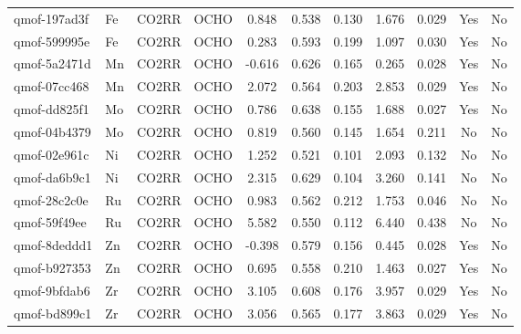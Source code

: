 {\begin{longtable}{llllccccccc}
qmof-197ad3f & Fe & CO2RR & OCHO & 0.848 & 0.538 & 0.130 & 1.676 & 0.029 & Yes & No \\
qmof-599995e & Fe & CO2RR & OCHO & 0.283 & 0.593 & 0.199 & 1.097 & 0.030 & Yes & No \\
qmof-5a2471d & Mn & CO2RR & OCHO & -0.616 & 0.626 & 0.165 & 0.265 & 0.028 & Yes & No \\
qmof-07cc468 & Mn & CO2RR & OCHO & 2.072 & 0.564 & 0.203 & 2.853 & 0.029 & Yes & No \\
qmof-dd825f1 & Mo & CO2RR & OCHO & 0.786 & 0.638 & 0.155 & 1.688 & 0.027 & Yes & No \\
qmof-04b4379 & Mo & CO2RR & OCHO & 0.819 & 0.560 & 0.145 & 1.654 & 0.211 & No & No \\
qmof-02e961c & Ni & CO2RR & OCHO & 1.252 & 0.521 & 0.101 & 2.093 & 0.132 & No & No \\
qmof-da6b9c1 & Ni & CO2RR & OCHO & 2.315 & 0.629 & 0.104 & 3.260 & 0.141 & No & No \\
qmof-28c2c0e & Ru & CO2RR & OCHO & 0.983 & 0.562 & 0.212 & 1.753 & 0.046 & No & No \\
qmof-59f49ee & Ru & CO2RR & OCHO & 5.582 & 0.550 & 0.112 & 6.440 & 0.438 & No & No \\
qmof-8deddd1 & Zn & CO2RR & OCHO & -0.398 & 0.579 & 0.156 & 0.445 & 0.028 & Yes & No \\
qmof-b927353 & Zn & CO2RR & OCHO & 0.695 & 0.558 & 0.210 & 1.463 & 0.027 & Yes & No \\
qmof-9bfdab6 & Zr & CO2RR & OCHO & 3.105 & 0.608 & 0.176 & 3.957 & 0.029 & Yes & No \\
qmof-bd899c1 & Zr & CO2RR & OCHO & 3.056 & 0.565 & 0.177 & 3.863 & 0.029 & Yes & No \\
\end{longtable}
}
